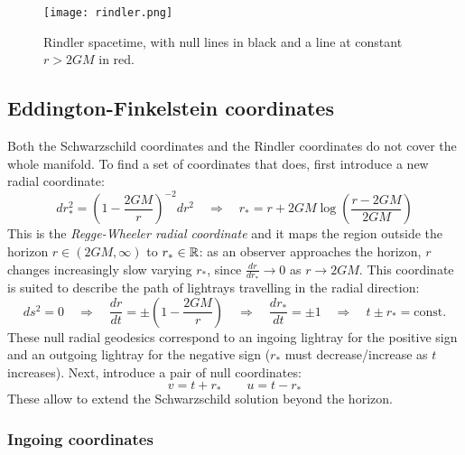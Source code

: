 \begin{figure}[b]
  \centering
  \texttt{[image: rindler.png]}
  \caption{Rindler spacetime, with null lines in black and a line at constant $ r > 2GM $ in red.}
  \label{rindler}
\end{figure}

\subsection{Eddington-Finkelstein coordinates}

Both the Schwarzschild coordinates and the Rindler coordinates do not cover the whole manifold. To find a set of coordinates that does, first introduce a new radial coordinate:
\begin{equation}
  dr_*^2 = \left( 1 - \frac{2GM}{r} \right)^{-2} dr^2
  \quad \Rightarrow \quad
  r_* = r + 2GM \log \left( \frac{r - 2GM}{2GM} \right)
  \label{eq:6.4}
\end{equation}
This is the \textit{Regge-Wheeler radial coordinate} and it maps the region outside the horizon $ r \in (2GM, \infty) $ to $ r_* \in \mathbb{R} $: as an observer approaches the horizon, $ r $ changes increasingly slow varying $ r_* $, since $ \frac{dr}{dr_*} \rightarrow 0 $ as $ r \rightarrow 2GM $. This coordinate is suited to describe the path of lightrays travelling in the radial direction:
\begin{equation*}
  ds^2 = 0
  \quad \Rightarrow \quad
  \frac{dr}{dt} = \pm \left( 1 - \frac{2GM}{r} \right)
  \quad \Rightarrow \quad
  \frac{dr_*}{dt} = \pm 1
  \quad \Rightarrow \quad
  t \pm r_* = \text{const.}
\end{equation*}
These null radial geodesics correspond to an ingoing lightray for the positive sign and an outgoing lightray for the negative sign ($ r_* $ must decrease/increase as $ t $ increases). Next, introduce a pair of null coordinates:
\begin{equation}
  v = t + r_*
  \qquad
  u = t - r_*
  \label{eq:6.5}
\end{equation}
These allow to extend the Schwarzschild solution beyond the horizon.

\subsubsection{Ingoing coordinates}

